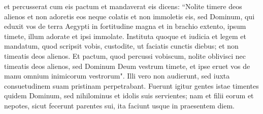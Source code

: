 \begin{biblechapter}
\verse et percusserat cum eis pactum et mandaverat eis dicens: “Nolite timere deos alienos et non adoretis eos neque colatis et non immoletis eis, 
\verse sed Dominum, qui eduxit vos de terra Aegypti in fortitudine magna et in brachio extento, ipsum timete, illum adorate et ipsi immolate. 
\verse Instituta quoque et iudicia et legem et mandatum, quod scripsit vobis, custodite, ut faciatis cunctis diebus; et non timeatis deos alienos. 
\verse Et pactum, quod percussi vobiscum, nolite oblivisci nec timeatis deos alienos, 
\verse sed Dominum Deum vestrum timete, et ipse eruet vos de manu omnium inimicorum vestrorum". 
\verse Illi vero non audierunt, sed iuxta consuetudinem suam pristinam perpetrabant. 
\verse Fuerunt igitur gentes istae timentes quidem Dominum, sed nihilominus et idolis suis servientes; nam et filii eorum et nepotes, sicut fecerunt parentes sui, ita faciunt usque in praesentem diem. 
\end{biblechapter}

